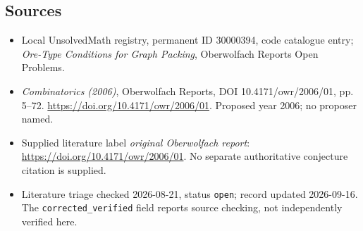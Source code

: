 \documentclass[11pt]{article}
\begin{document}
\subsection{Sources}
\begin{itemize}\item Local UnsolvedMath registry, permanent ID 30000394, code catalogue entry; \emph{Ore-Type Conditions for Graph Packing}, Oberwolfach Reports Open Problems.\item \emph{Combinatorics (2006)}, Oberwolfach Reports, DOI 10.4171/owr/2006/01, pp. 5--72. \url{https://doi.org/10.4171/owr/2006/01}. Proposed year 2006; no proposer named.\item Supplied literature label \emph{original Oberwolfach report}: \url{https://doi.org/10.4171/owr/2006/01}. No separate authoritative conjecture citation is supplied.\item Literature triage checked 2026-08-21, status \texttt{open}; record updated 2026-09-16. The \texttt{corrected\_verified} field reports source checking, not independently verified here.\end{itemize}
\end{document}
